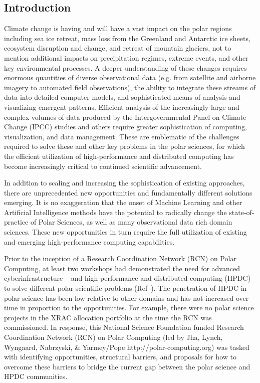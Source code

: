 \documentclass[10pt,letterpaper,draft]{article}
\begin{document}
\vspace{0.15in}

\subsection*{Introduction}

Climate change is having and will have a vast impact on the polar regions including sea ice retreat, mass loss from the Greenland and Antarctic ice sheets, ecosystem disruption and change, and retreat of mountain glaciers, not to mention additional impacts on precipitation regimes, extreme events, and other key environmental processes. A deeper understanding of these changes requires enormous quantities of diverse observational data (e.g. from satellite and airborne imagery to automated field observations), the ability to integrate these streams of data into detailed computer models, and sophisticated means of analysis and visualizing emergent patterns.  Efficient analysis of the increasingly large and complex volumes of data produced by the Intergovernmental Panel on Climate Change (IPCC) studies and others require greater sophistication of computing, visualization, and data management. These are emblematic of the challenges required to solve these and other key problems in the polar sciences, for which the efficient utilization of high-performance and distributed computing has become increasingly critical to continued scientific advancement.

In addition to scaling and increasing the sophistication of existing approaches, there are unprecedented new opportunities and fundamentally different solutions emerging. It is no exaggeration that the onset of Machine Learning and other Artificial Intelligence methods have the potential to radically change the state-of-practice of Polar Sciences, as well as many observational data rich domain sciences.  These new opportunities in turn require the full utilization of existing and emerging high-performance computing capabilities. 

Prior to the inception of a Research Coordination Network (RCN) on Polar Computing, at least two workshops had demonstrated the need for advanced cyberinfrastructure ~\cite{Skytland2016-jk} and high-performance and distributed computing (HPDC) to solve different polar scientific problems (Ref~\cite{hackathon_guide,Leckart2015-go}). The penetration of HPDC in polar science has been low relative to other domains and has not increased over time in proportion to the opportunities. For example, there were no polar science projects in the XRAC allocation portfolio at the time the RCN was commissioned. In response, this National Science Foundation funded Research Coordination Network (RCN) on Polar Computing (led by Jha, Lynch, Wyngaard, Nabrzyski, \& Yarmey/Pope http://polar-computing.org) was tasked with identifying opportunities, structural barriers, and proposals for how to overcome these barriers to bridge the current gap between the polar science and HPDC communities.
\end{document}
